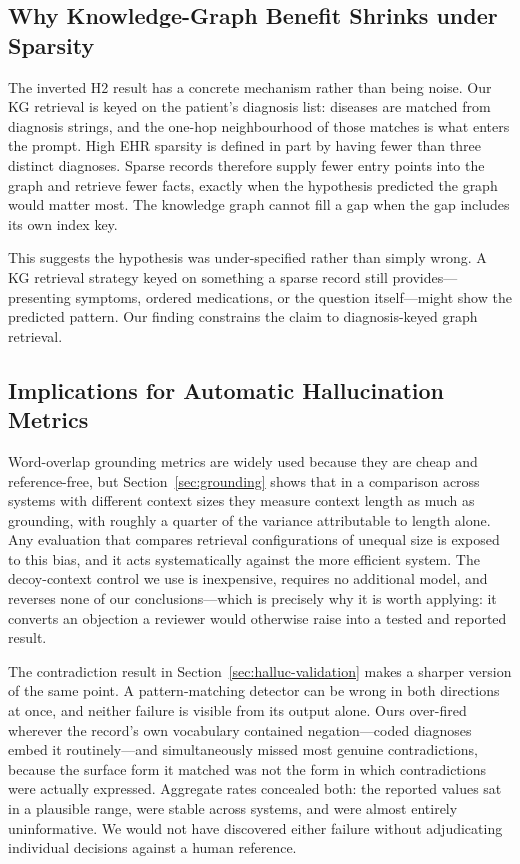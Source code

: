 \documentclass[preprint,12pt]{elsarticle}
\begin{document}
\subsection{Why Knowledge-Graph Benefit Shrinks under Sparsity}

The inverted H2 result has a concrete mechanism rather than being
noise. Our KG retrieval is keyed on the patient's diagnosis list:
diseases are matched from diagnosis strings, and the one-hop
neighbourhood of those matches is what enters the prompt. High EHR
sparsity is defined in part by having fewer than three distinct
diagnoses. Sparse records therefore supply fewer entry points into the
graph and retrieve fewer facts, exactly when the hypothesis predicted
the graph would matter most. The knowledge graph cannot fill a gap
when the gap includes its own index key.

This suggests the hypothesis was under-specified rather than simply
wrong. A KG retrieval strategy keyed on something a sparse record still
provides---presenting symptoms, ordered medications, or the question
itself---might show the predicted pattern. Our finding constrains the
claim to diagnosis-keyed graph retrieval.

\subsection{Implications for Automatic Hallucination Metrics}

Word-overlap grounding metrics are widely used because they are cheap
and reference-free, but Section~\ref{sec:grounding} shows that in a
comparison across systems with different context sizes they measure
context length as much as grounding, with roughly a quarter of the
variance attributable to length alone. Any evaluation that compares
retrieval configurations of unequal size is exposed to this bias, and
it acts systematically against the more efficient system. The
decoy-context control we use is inexpensive, requires no additional
model, and reverses none of our conclusions---which is precisely why
it is worth applying: it converts an objection a reviewer would
otherwise raise into a tested and reported result.

The contradiction result in Section~\ref{sec:halluc-validation} makes a
sharper version of the same point. A pattern-matching detector can be
wrong in both directions at once, and neither failure is visible from
its output alone. Ours over-fired wherever the record's own vocabulary
contained negation---coded diagnoses embed it routinely---and
simultaneously missed most genuine contradictions, because the surface
form it matched was not the form in which contradictions were actually
expressed. Aggregate rates concealed both: the reported values sat in a
plausible range, were stable across systems, and were almost entirely
uninformative. We would not have discovered either failure without
adjudicating individual decisions against a human reference.
\end{document}
